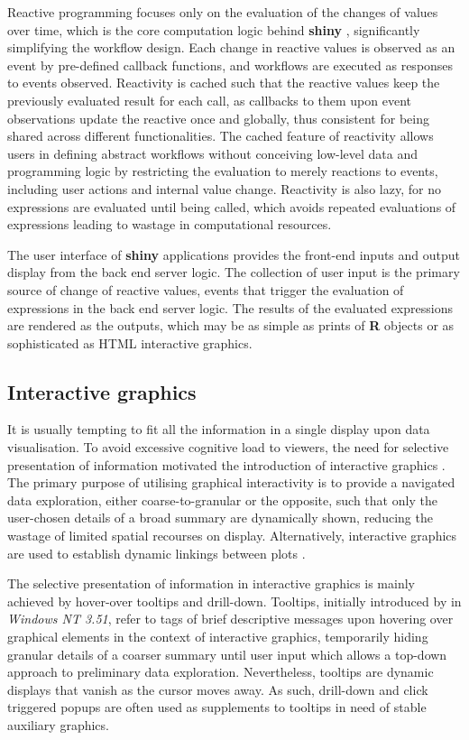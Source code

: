 \documentclass{aucklandthesis}
\begin{document}
Reactive programming focuses only on the evaluation of the changes of values over time, which is the core computation logic behind \textbf{shiny} \autocite{mshiny}, significantly simplifying the workflow design. Each change in reactive values is observed as an event by pre-defined callback functions, and workflows are executed as responses to events observed. Reactivity is cached such that the reactive values keep the previously evaluated result for each call, as callbacks to them upon event observations update the reactive once and globally, thus consistent for being shared across different functionalities. The cached feature of reactivity allows users in defining abstract workflows without conceiving low-level data and programming logic by restricting the evaluation to merely reactions to events, including user actions and internal value change. Reactivity is also lazy, for no expressions are evaluated until being called, which avoids repeated evaluations of expressions leading to wastage in computational resources.

The user interface of \textbf{shiny} applications provides the front-end inputs and output display from the back end server logic. The collection of user input is the primary source of change of reactive values, events that trigger the evaluation of expressions in the back end server logic. The results of the evaluated expressions are rendered as the outputs, which may be as simple as prints of \textbf{R} objects or as sophisticated as HTML interactive graphics.

\hypertarget{sec:int-graphics}{%
\subsection{Interactive graphics}\label{sec:int-graphics}}

It is usually tempting to fit all the information in a single display upon data visualisation. To avoid excessive cognitive load to viewers, the need for selective presentation of information motivated the introduction of interactive graphics \autocite{intg}. The primary purpose of utilising graphical interactivity is to provide a navigated data exploration, either coarse-to-granular or the opposite, such that only the user-chosen details of a broad summary are dynamically shown, reducing the wastage of limited spatial recourses on display. Alternatively, interactive graphics are used to establish dynamic linkings between plots \autocite{intg}.

The selective presentation of information in interactive graphics is mainly achieved by hover-over tooltips and drill-down. Tooltips, initially introduced by \textcite{tt} in \emph{Windows NT 3.51}, refer to tags of brief descriptive messages upon hovering over graphical elements in the context of interactive graphics, temporarily hiding granular details of a coarser summary until user input which allows a top-down approach to preliminary data exploration. Nevertheless, tooltips are dynamic displays that vanish as the cursor moves away. As such, drill-down \autocite{plotly} and click triggered popups are often used as supplements to tooltips in need of stable auxiliary graphics.
\end{document}
